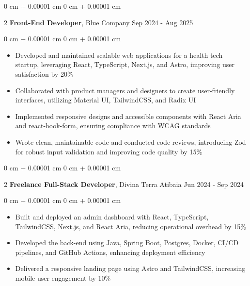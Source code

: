 \documentclass[10pt, letterpaper]{article}
\newenvironment{highlights}{ \begin{itemize}[ topsep=0.10 cm, parsep=0.10 cm, partopsep=0pt,
itemsep=0pt, leftmargin=0 cm + 10pt ] }{ \end{itemize} } %
\newenvironment{onecolentry}{ \begin{adjustwidth}{ 0 cm + 0.00001 cm }{ 0 cm + 0.00001 cm }
}{ \end{adjustwidth} } %
\newenvironment{twocolentry}[2][]{ \onecolentry \def\secondColumn{#2} \setcolumnwidth{\fill, 4.5 cm}
\begin{paracol}{2} }{ \switchcolumn \raggedleft \secondColumn \end{paracol}
\endonecolentry } %
\begin{document}
	\vspace{0.2 cm}

	\begin{twocolentry}
		{ Sep 2024 - Aug 2025 } \textbf{Front-End Developer}, Blue Company
	\end{twocolentry}

	\vspace{0.10 cm}
	\begin{onecolentry}
		\begin{highlights}
			\item Developed and maintained scalable web applications for a health tech startup, leveraging React, TypeScript, Next.js, and Astro, improving user satisfaction by 20\%
			\item Collaborated with product managers and designers to create user-friendly interfaces, utilizing Material UI, TailwindCSS, and Radix UI
			\item Implemented responsive designs and accessible components with React Aria and react-hook-form, ensuring compliance with WCAG standards
			\item Wrote clean, maintainable code and conducted code reviews, introducing Zod for robust input validation and improving code quality by 15\%
		\end{highlights}
	\end{onecolentry}

	\vspace{0.2 cm}

	\begin{twocolentry}
		{ Jun 2024 - Sep 2024 } \textbf{Freelance Full-Stack Developer}, Divina Terra Atibaia
	\end{twocolentry}

	\vspace{0.10 cm}
	\begin{onecolentry}
		\begin{highlights}
			\item Built and deployed an admin dashboard with React, TypeScript, TailwindCSS, Next.js, and React Aria, reducing operational overhead by 15\%
			\item Developed the back-end using Java, Spring Boot, Postgres, Docker, CI/CD pipelines, and GitHub Actions, enhancing deployment efficiency
			\item Delivered a responsive landing page using Astro and TailwindCSS, increasing mobile user engagement by 10\%
		\end{highlights}
	\end{onecolentry}
\end{document}
